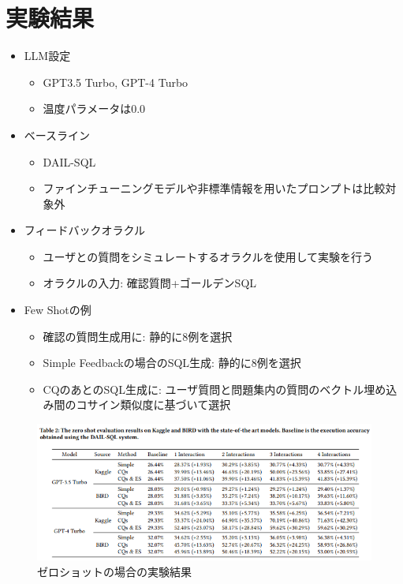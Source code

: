 \documentclass[dvipdfmx,uplatex]{jsarticle}
\theoremstyle{remark}
\newenvironment{experiment}[1]{
    \begin{tcolorbox}[
        colframe=violet,
        colback=violet!10!white,
        colbacktitle=violet!40!white,
        coltitle=black,
        fonttitle=\bfseries,
        title={#1}
    ]
}{
    \end{tcolorbox}
}
\begin{document}
\section{実験結果}
\begin{experiment}{実験手法}
\begin{itemize}
    \item LLM設定
    \begin{itemize}
        \item GPT3.5 Turbo, GPT-4 Turbo
        \item 温度パラメータは$0.0$
    \end{itemize}
    \item ベースライン
    \begin{itemize}
        \item DAIL-SQL
        \item ファインチューニングモデルや非標準情報を用いたプロンプトは比較対象外
    \end{itemize}
    \item フィードバックオラクル
    \begin{itemize}
        \item ユーザとの質問をシミュレートするオラクルを使用して実験を行う
        \item オラクルの入力: 確認質問+ゴールデンSQL
    \end{itemize}
    \item Few Shotの例
    \begin{itemize}
        \item 確認の質問生成用に: 静的に8例を選択
        \item Simple Feedbackの場合のSQL生成: 静的に8例を選択
        \item CQのあとのSQL生成に: ユーザ質問と問題集内の質問のベクトル埋め込み間のコサイン類似度に基づいて選択 
    \end{itemize}
\end{itemize}
\end{experiment}

\begin{figure}
    \centering
    \includegraphics[width=\textwidth]{img/sphinteract/zero-shot.png}
    \caption{ゼロショットの場合の実験結果}
    \label{fig:zero-shot}
\end{figure}
\end{document}
